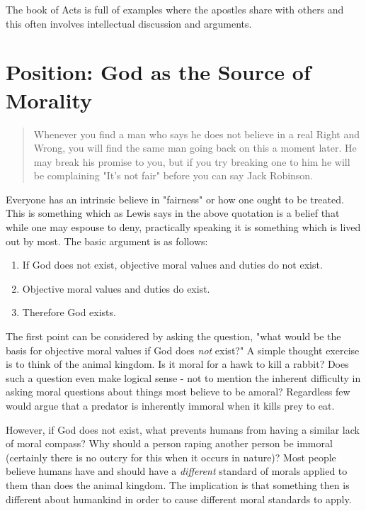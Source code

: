 \documentclass[12pt]{turabian-researchpaper}
\begin{document}
The book of Acts is full of examples where the apostles share with others and this often involves intellectual discussion and arguments. 

\section{Position: God as the Source of Morality}


\begin{quotation}
\noindent Whenever you find a man who says he does not believe in a real Right and Wrong, you will find the same man going back on this a moment later. He may break his promise to you, but if you try breaking one to him he will be complaining "It's not fair" before you can say Jack Robinson.\autocite[pg.6]{lewis2001mere}
\end{quotation}

\noindent Everyone has an intrinsic believe in "fairness" or how one ought to be treated. This is something which as Lewis says in the above quotation is a belief that while one may espouse to deny, practically speaking it is something which is lived out by most. The basic argument is as follows\autocite[pg.172]{craig2008reasonable}:

\begin{enumerate}
\item If God does not exist, objective moral values and duties do not exist.
\item Objective moral values and duties do exist.
\item Therefore God exists.
\end{enumerate}

The first point can be considered by asking the question, "what would be the basis for objective moral values if God does \textit{not} exist?" A simple thought exercise is to think of the animal kingdom. Is it moral for a hawk to kill a rabbit? Does such a question even make logical sense - not to mention the inherent difficulty in asking moral questions about things most believe to be amoral? Regardless few would argue that a predator is inherently immoral when it kills prey to eat.

However, if God does not exist, what prevents humans from having a similar lack of moral compass? Why should a person raping another person be immoral (certainly there is no outcry for this when it occurs in nature)? Most people believe humans have and should have a \textit{different} standard of morals applied to them than does the animal kingdom. The implication is that something then is different about humankind in order to cause different moral standards to apply.
\end{document}
